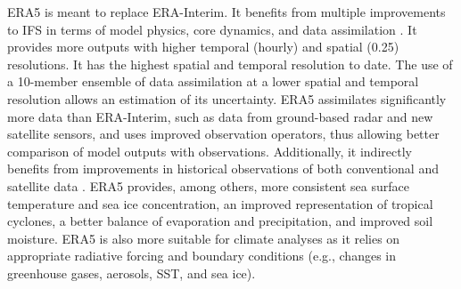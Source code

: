 \documentclass[alpha-refs]{wiley-article}
\begin{document}
ERA5 \citep{Hersbach2020} is meant to replace ERA-Interim. It benefits from multiple improvements to IFS in terms of model physics, core dynamics, and data assimilation \citep{Hersbach2020}. It provides more outputs with higher temporal (hourly) and spatial (0.25\degree) resolutions. It has the highest spatial and temporal resolution to date. The use of a 10-member ensemble of data assimilation at a lower spatial and temporal resolution allows an estimation of its uncertainty. ERA5 assimilates significantly more data than ERA-Interim, such as data from ground-based radar and new satellite sensors, and uses improved observation operators, thus allowing better comparison of model outputs with observations. Additionally, it indirectly benefits from improvements in historical observations of both conventional and satellite data \citep{Hersbach2020}. ERA5 provides, among others, more consistent sea surface temperature and sea ice concentration, an improved representation of tropical cyclones, a better balance of evaporation and precipitation, and improved soil moisture. ERA5 is also more suitable for climate analyses as it relies on appropriate radiative forcing and boundary conditions (e.g., changes in greenhouse gases, aerosols, SST, and sea ice).
\end{document}
